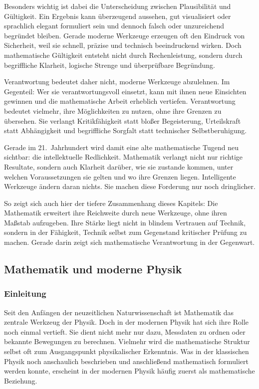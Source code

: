 Besonders wichtig ist dabei die Unterscheidung zwischen Plausibilität und Gültigkeit. Ein Ergebnis kann überzeugend aussehen, gut visualisiert oder sprachlich elegant formuliert sein und dennoch falsch oder unzureichend begründet bleiben. Gerade moderne Werkzeuge erzeugen oft den Eindruck von Sicherheit, weil sie schnell, präzise und technisch beeindruckend wirken. Doch mathematische Gültigkeit entsteht nicht durch Rechenleistung, sondern durch begriffliche Klarheit, logische Strenge und überprüfbare Begründung.

Verantwortung bedeutet daher nicht, moderne Werkzeuge abzulehnen. Im Gegenteil: Wer sie verantwortungsvoll einsetzt, kann mit ihnen neue Einsichten gewinnen und die mathematische Arbeit erheblich vertiefen. Verantwortung bedeutet vielmehr, ihre Möglichkeiten zu nutzen, ohne ihre Grenzen zu übersehen. Sie verlangt Kritikfähigkeit statt bloßer Begeisterung, Urteilskraft statt Abhängigkeit und begriffliche Sorgfalt statt technischer Selbstberuhigung.

Gerade im 21.~Jahrhundert wird damit eine alte mathematische Tugend neu sichtbar: die intellektuelle Redlichkeit. Mathematik verlangt nicht nur richtige Resultate, sondern auch Klarheit darüber, wie sie zustande kommen, unter welchen Voraussetzungen sie gelten und wo ihre Grenzen liegen. Intelligente Werkzeuge ändern daran nichts. Sie machen diese Forderung nur noch dringlicher.

So zeigt sich auch hier der tiefere Zusammenhang dieses Kapitels: Die Mathematik erweitert ihre Reichweite durch neue Werkzeuge, ohne ihren Maßstab aufzugeben. Ihre Stärke liegt nicht in blindem Vertrauen auf Technik, sondern in der Fähigkeit, Technik selbst zum Gegenstand kritischer Prüfung zu machen. Gerade darin zeigt sich mathematische Verantwortung in der Gegenwart.


\subsection{Mathematik und moderne Physik}

\subsubsection{Einleitung}

Seit den Anfängen der neuzeitlichen Naturwissenschaft ist Mathematik das zentrale Werkzeug der Physik. Doch in der modernen Physik hat sich ihre Rolle noch einmal vertieft. Sie dient nicht mehr nur dazu, Messdaten zu ordnen oder bekannte Bewegungen zu berechnen. Vielmehr wird die mathematische Struktur selbst oft zum Ausgangspunkt physikalischer Erkenntnis. Was in der klassischen Physik noch anschaulich beschrieben und anschließend mathematisch formuliert werden konnte, erscheint in der modernen Physik häufig zuerst als mathematische Beziehung.

